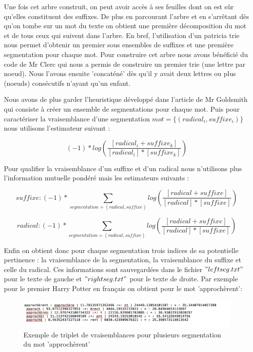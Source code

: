 \documentclass[11pt, oneside]{article}   	%
\begin{document}
Une fois cet arbre construit, on peut avoir accès à ses feuilles dont on est sûr qu'elles constituent des suffixes. De plus en parcourant l'arbre et en s'arrêtant dès qu'on tombe sur un mot du texte on obtient une première décomposition du mot et de tous ceux qui suivent dans l'arbre. En bref, l'utilisation d'un patricia trie nous permet d'obtenir un premier sous ensembles de suffixes et une première segmentation pour chaque mot. Pour construire cet arbre nous avons bénéficié du code de Mr Clerc qui nous a permis de construire un premier trie (une lettre par noeud). Nous l'avons ensuite 'concaténé' dès qu'il y avait deux lettres ou plus (noeuds) consécutifs n'ayant qu'un enfant.

Nous avons de plus garder l'heuristique développé dans l'article de Mr Goldsmith qui consiste à créer un ensemble de segmentations pour chaque mot. Puis pour caractériser la vraisemblance d'une segmentation $mot = \{(radical_{i}, suffixe_{i})\}$ nous utilisons l'estimateur suivant : 

\begin{equation}
 (-1) * log(\frac{[radical_{i}+suffixe_{k}]}{[radical_{i}] * [suffixe_{k}]})
\end{equation}


Pour qualifier la vraisemblance d'un suffixe et d'un radical nous n'utilisons plus l'information mutuelle pondéré mais les estimateurs suivants : 

\begin{equation}
suffixe : (-1) * \sum_{segmentation = (radical, suffixe) }^{}  log(\frac{[radical + suffixe]}{[radical] * [suffixe]})
\end{equation}

\begin{equation}
radical : (-1) * \sum_{segmentation = (radical, suffixe) }^{}  log(\frac{[radical + suffixe]}{[radical] * [suffixe]})
\end{equation}


Enfin on obtient donc pour chaque segmentation trois indices de sa potentielle pertinence :  la vraisemblance de la segmentation, 
la vraisemblance du suffixe et celle du radical. Ces informations sont sauvegardées dans le fichier $"left seg.txt"$ pour le texte de gauche 
et $"right seg.txt"$ pour le texte de droite. Par exemple pour le premier Harry Potter en français on obtient pour le mot 'approchèrent': 


\begin{figure}[!h]
\centering
\includegraphics[width = 500pt]{seg_info.png}
\caption{Exemple de triplet de vraisemblances pour plusieurs segmentation du mot 'approchèrent'}
\end{figure}
\end{document}
